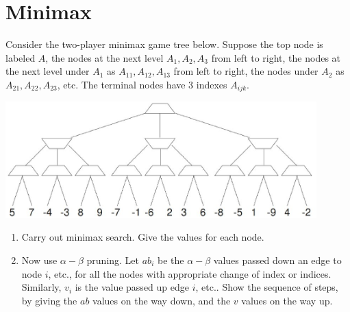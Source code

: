 \documentclass[11pt]{article}
\begin{document}
\clearpage

\section{Minimax}

Consider the two-player minimax game tree below.  Suppose the top node
is labeled $A$, the nodes at the next level $A_1, A_2, A_3$ from left
to right, the nodes at the next level under $A_1$ as $A_{11}, A_{12},
A_{13}$ from left to right, the nodes under $A_2$ as $A_{21}, A_{22},
A_{23}$, etc.  The terminal nodes have 3 indexes $A_{ijk}$.

\centerline{\includegraphics[width=0.9\textwidth]{minimax.eps}}

\begin{enumerate}

\item Carry out minimax search.  Give the values for each node.

\item Now use $\alpha-\beta$ pruning.  Let $ab_{i}$ be the
  $\alpha-\beta$ values passed down an edge to node $i$, etc., for all
  the nodes with appropriate change of index or indices.  Similarly,
  $v_i$ is the value passed up edge $i$, etc..  Show the sequence of
  steps, by giving the $ab$ values on the way down, and the $v$ values
  on the way up.

\end{enumerate}
\end{document}

